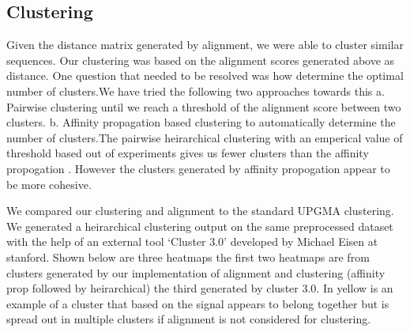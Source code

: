 \documentclass[aps,prd,final,onecolumn,a4paper,10pt]{revtex4}
\begin{document}
\subsection{Clustering}


Given the distance matrix generated by alignment, we were able to cluster similar sequences.
Our clustering was based on the alignment scores generated above as distance.
One question that needed to be resolved was how determine the optimal number of
clusters.We have tried the following two approaches towards this
a. Pairwise clustering until we reach a threshold of the alignment score between
two clusters.
b. Affinity propagation based clustering to automatically determine the number of
clusters.The pairwise heirarchical clustering with an emperical value of threshold based
out of experiments gives us fewer clusters than the affinity propogation . However the clusters 
generated by affinity propogation appear to be more cohesive.

We compared our clustering and alignment to the standard UPGMA clustering. We generated a heirarchical clustering output on the same preprocessed dataset with the help of an external tool ‘Cluster 3.0’ developed by Michael Eisen at stanford.
Shown below are three heatmaps the first two heatmaps are from clusters generated by our implementation of alignment and clustering (affinity prop followed by heirarchical) the third generated by cluster 3.0. In yellow is an example of a cluster that based on the signal appears to belong together but is spread out in multiple clusters if alignment is not considered for clustering.
\end{document}
